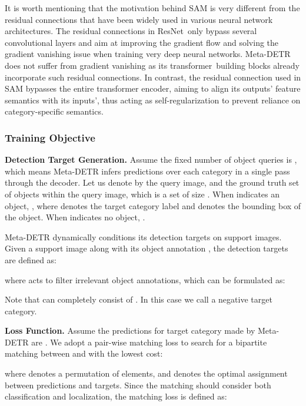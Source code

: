 \documentclass[10pt,twocolumn,letterpaper]{article}
\begin{document}
It is worth mentioning that the motivation behind SAM is very different from the residual connections that have been widely used in various neural network architectures. The residual connections in ResNet\,\cite{resnet} only bypass several convolutional layers and aim at improving the gradient flow and solving the gradient vanishing issue when training very deep neural networks. Meta-DETR does not suffer from gradient vanishing as its transformer\,\cite{transformer} building blocks already incorporate such residual connections. In contrast, the residual connection used in SAM bypasses the entire transformer encoder, aiming to align its outputs' feature semantics with its inputs', thus acting as self-regularization to prevent reliance on category-specific semantics.


\subsubsection{Training Objective} \label{sec:TrainingObjective}

\noindent
\textbf{Detection Target Generation.}
Assume the fixed number of object queries is , which means Meta-DETR infers  predictions over each category in a single pass through the decoder. Let us denote by  the query image, and  the ground truth set of objects within the query image, which is a set of size . When  indicates an object, , where  denotes the target category label and  denotes the bounding box of the object. When  indicates no object, .

\smallskip
\smallskip
Meta-DETR dynamically conditions its detection targets on support images. Given a support image  along with its object annotation , the detection targets are defined as:

where  acts to filter irrelevant object annotations, which can be formulated as:

Note that  can completely consist of . In this case we call  a negative target category.

\medskip
\smallskip
\noindent
\textbf{Loss Function.}
Assume the  predictions for target category made by Meta-DETR are . We adopt a pair-wise matching loss  to search for a bipartite matching between  and  with the lowest cost:

where  denotes a permutation of  elements, and  denotes the optimal assignment between predictions and targets. Since the matching should consider both classification and localization, the matching loss is defined as:
\end{document}
